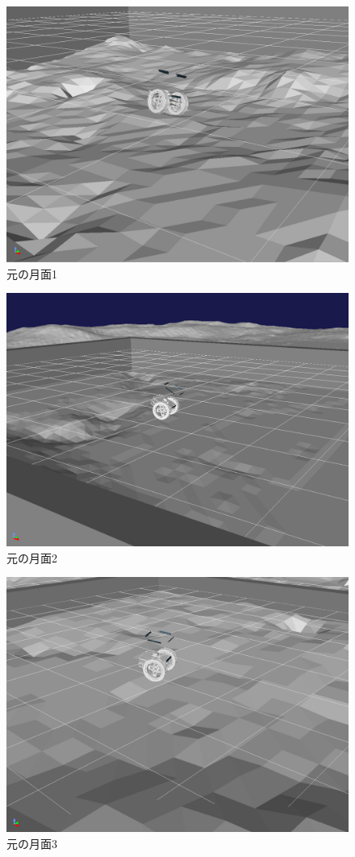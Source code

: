 \begin{figure}[htbp]
  \begin{center}
   \includegraphics[width=0.6\linewidth]{images/test_field_origin1.png}
   \caption{元の月面1}
   \label{fig:test_field_origin1}
  \end{center}
 \end{figure}
 \begin{figure}[htbp]
  \begin{center}
   \includegraphics[width=0.6\linewidth]{images/test_field_origin2.png}
   \caption{元の月面2}
   \label{fig:test_field_origin2}
  \end{center}
 \end{figure}
 \begin{figure}[htbp]
  \begin{center}
   \includegraphics[width=0.6\linewidth]{images/origin_moon_field3.png}
   \caption{元の月面3}
   \label{fig:origin_moon_field3}
  \end{center}
 \end{figure}
